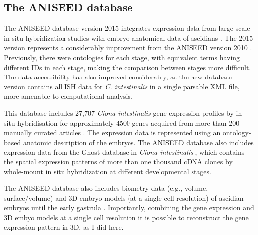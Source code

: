 \subsection{The ANISEED database}

The ANISEED database version 2015 integrates expression data from large-scale in situ hybridization studies with embryo anatomical data of ascidians \citep{Brozovic2016}. The 2015 version represents a considerably improvement from the ANISEED version 2010 \citep{Tassy2010}. Previously, there were ontologies for each stage, with equivalent terms having different IDs in each stage, making the comparison between stages more difficult. The data accessibility has also improved considerably, as the new database version contains all ISH data for \textit{C. intestinalis} in a single parsable XML file, more amenable to computational analysis.

This database includes 27,707 \textit{Ciona intestinalis} gene expression profiles by in situ hybridisation for approximately 4500 genes acquired from more than 200 manually curated articles \citep{Brozovic2016}.
%
The expression data is represented using an ontology-based anatomic description of the embryos. The ANISEED database also includes expression data from the Ghost database in \textit{Ciona intestinalis} \citep{Satou2005}, which contains the spatial expression patterns of more than one thousand cDNA clones by whole-mount in situ hybridization at different developmental stages.

The ANISEED database also includes biometry data (e.g., volume, surface/volume) and 3D embryo models (at a single-cell resolution) of ascidian embryos until the early gastrula \citep{Tassy2006}. Importantly, combining the gene expression and 3D embyo models at a single cell resolution it is possible to reconstruct the gene expression pattern in 3D, as I did here. 


